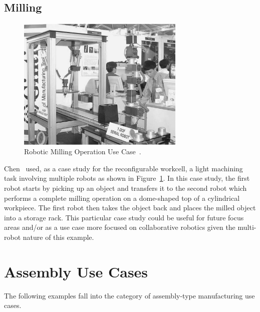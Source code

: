 \subsection{Milling}
\begin{figure}[!htb]
\centering
\includegraphics[width=8cm]{Figures/Tony-Fig2.jpg}
\caption{Robotic Milling Operation Use Case~\cite{Chen.2001}.}
\label{fig:Tony2}
\end{figure}

Chen~\cite{Chen.2001} used, as a case study for the reconfigurable workcell, a light machining task involving multiple robots as shown in Figure~\ref{fig:Tony2}. In this case study, the first robot starts by picking up an object and transfers it to the second robot which performs a complete milling operation on a dome-shaped top of a cylindrical workpiece. The first robot then takes the object back and places the milled object into a storage rack. This particular case study could be useful for future focus areas and/or as a use case more focused on collaborative robotics given the multi-robot nature of this example.

\section{Assembly Use Cases}
The following examples fall into the category of assembly-type manufacturing use cases.
